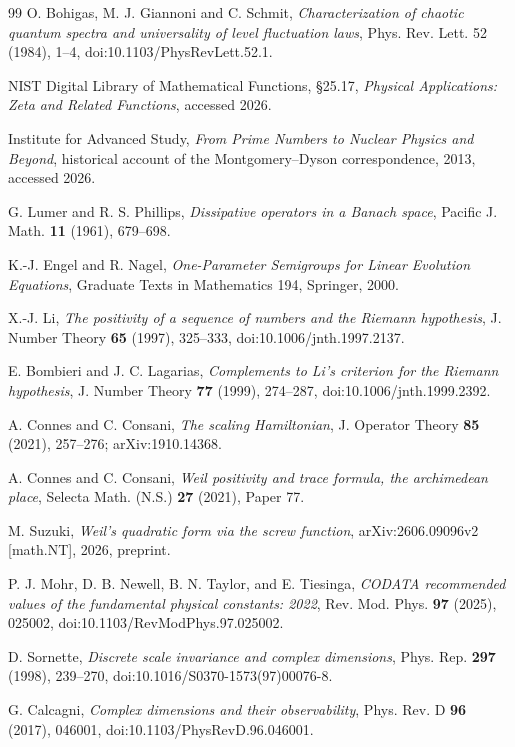 \documentclass[11pt]{amsart}
\theoremstyle{definition}
\theoremstyle{remark}
\begin{document}
\begin{thebibliography}{99}
O. Bohigas, M. J. Giannoni and C. Schmit, \emph{Characterization of chaotic quantum spectra and universality of level fluctuation laws}, Phys. Rev. Lett. 52 (1984), 1--4, doi:10.1103/PhysRevLett.52.1.

NIST Digital Library of Mathematical Functions, \S25.17, \emph{Physical Applications: Zeta and Related Functions}, accessed 2026.

Institute for Advanced Study, \emph{From Prime Numbers to Nuclear Physics and Beyond}, historical account of the Montgomery--Dyson correspondence, 2013, accessed 2026.

G. Lumer and R. S. Phillips, \emph{Dissipative operators in a Banach space}, Pacific J. Math. \textbf{11} (1961), 679--698.

K.-J. Engel and R. Nagel, \emph{One-Parameter Semigroups for Linear Evolution Equations}, Graduate Texts in Mathematics 194, Springer, 2000.

X.-J. Li, \emph{The positivity of a sequence of numbers and the Riemann hypothesis}, J. Number Theory \textbf{65} (1997), 325--333, doi:10.1006/jnth.1997.2137.

E. Bombieri and J. C. Lagarias, \emph{Complements to Li's criterion for the Riemann hypothesis}, J. Number Theory \textbf{77} (1999), 274--287, doi:10.1006/jnth.1999.2392.

A. Connes and C. Consani, \emph{The scaling Hamiltonian}, J. Operator Theory \textbf{85} (2021), 257--276; arXiv:1910.14368.

A. Connes and C. Consani, \emph{Weil positivity and trace formula, the archimedean place}, Selecta Math. (N.S.) \textbf{27} (2021), Paper 77.

M. Suzuki, \emph{Weil's quadratic form via the screw function}, arXiv:2606.09096v2 [math.NT], 2026, preprint.

P. J. Mohr, D. B. Newell, B. N. Taylor, and E. Tiesinga,
\emph{CODATA recommended values of the fundamental physical constants: 2022},
Rev. Mod. Phys. \textbf{97} (2025), 025002,
doi:10.1103/RevModPhys.97.025002.

D. Sornette, \emph{Discrete scale invariance and complex dimensions},
Phys. Rep. \textbf{297} (1998), 239--270,
doi:10.1016/S0370-1573(97)00076-8.

G. Calcagni, \emph{Complex dimensions and their observability},
Phys. Rev. D \textbf{96} (2017), 046001,
doi:10.1103/PhysRevD.96.046001.


\end{thebibliography}
\end{document}
